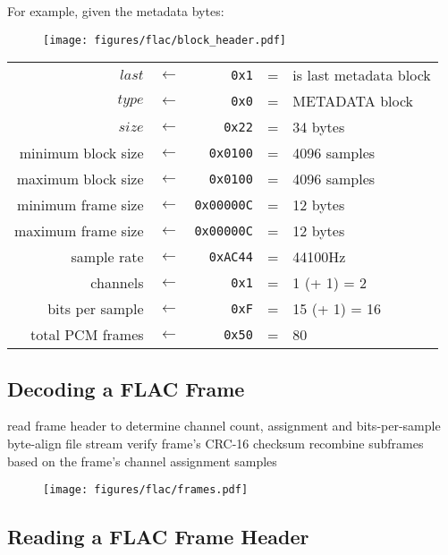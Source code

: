 \clearpage

For example, given the metadata bytes:
\begin{figure}[h]
\texttt{[image: figures/flac/block\_header.pdf]}
\end{figure}
\par
\noindent
\begin{tabular}{rcrcl}
$last$ & $\leftarrow$ & \texttt{0x1} & = & is last metadata block \\
$type$ & $\leftarrow$ & \texttt{0x0} & = & METADATA block \\
$size$ & $\leftarrow$ & \texttt{0x22} & = & 34 bytes \\
minimum block size & $\leftarrow$ & \texttt{0x0100} & = & 4096 samples \\
maximum block size & $\leftarrow$ & \texttt{0x0100} & = & 4096 samples \\
minimum frame size & $\leftarrow$ & \texttt{0x00000C} & = & 12 bytes \\
maximum frame size & $\leftarrow$ & \texttt{0x00000C} & = & 12 bytes \\
sample rate & $\leftarrow$ & \texttt{0xAC44} & = & 44100Hz \\
channels & $\leftarrow$ & \texttt{0x1} & = & 1 (+ 1) = 2 \\
bits per sample & $\leftarrow$ & \texttt{0xF} & = & 15 (+ 1) = 16 \\
total PCM frames & $\leftarrow$ & \texttt{0x50} & = & 80
\end{tabular}

\clearpage

\subsection{Decoding a FLAC Frame}

read frame header to determine channel count, assignment and bits-per-sample\;
byte-align file stream\;
verify frame's CRC-16 checksum\;
recombine subframes based on the frame's channel assignment\;
\Return samples\;
\EALGORITHM
\begin{figure}[h]
\texttt{[image: figures/flac/frames.pdf]}
\end{figure}

\clearpage

\subsection{Reading a FLAC Frame Header}

